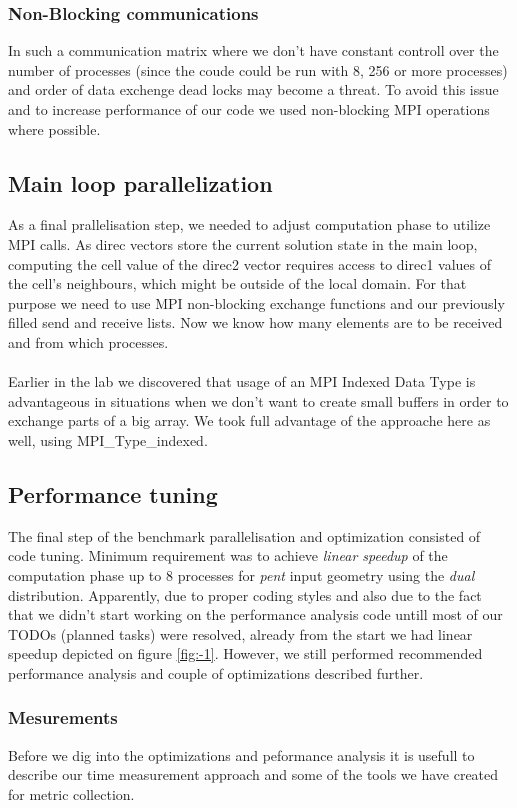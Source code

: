 \documentclass{article}
\begin{document}
\subsubsection{Non-Blocking communications}
In such a communication matrix where we don't have constant controll over the number of processes (since the coude could be run with 8, 256 or more processes) and order of data exchenge dead locks may become a threat. To avoid this issue and to increase performance of our code we used non-blocking MPI operations where possible.

\subsection{Main loop parallelization}
As a final prallelisation step, we needed to adjust computation phase to utilize MPI calls. As direc vectors store the current solution state in the main loop, computing the cell value of the direc2 vector requires access to direc1 values of the cell’s neighbours, which might be outside of the local domain. For that purpose we need to use MPI non-blocking exchange functions and our previously filled send and receive lists. Now we know how many elements are to be received and from which processes.
\\\\
Earlier in the lab we discovered that usage of an MPI Indexed Data Type is advantageous in situations when we don't want to create small buffers in order to exchange parts of a big array. We took full advantage of the approache here as well, using MPI\_Type\_indexed.

\subsection{Performance tuning}
The final step of the benchmark parallelisation and optimization consisted of code tuning. Minimum requirement was to achieve \textit{linear speedup} of the computation phase up to 8 processes for \textit{pent} input geometry using the \textit{dual} distribution. Apparently, due to proper coding styles and also due to the fact that we didn't start working on the performance analysis code untill most of our TODOs (planned tasks) were resolved, already from the start we had linear speedup depicted on figure \ref{fig:-1}. However, we still performed recommended performance analysis and couple of optimizations described further.

\subsubsection{Mesurements}
Before we dig into the optimizations and peformance analysis it is usefull to describe our time measurement approach and some of the tools we have created for metric collection. 
\end{document}
